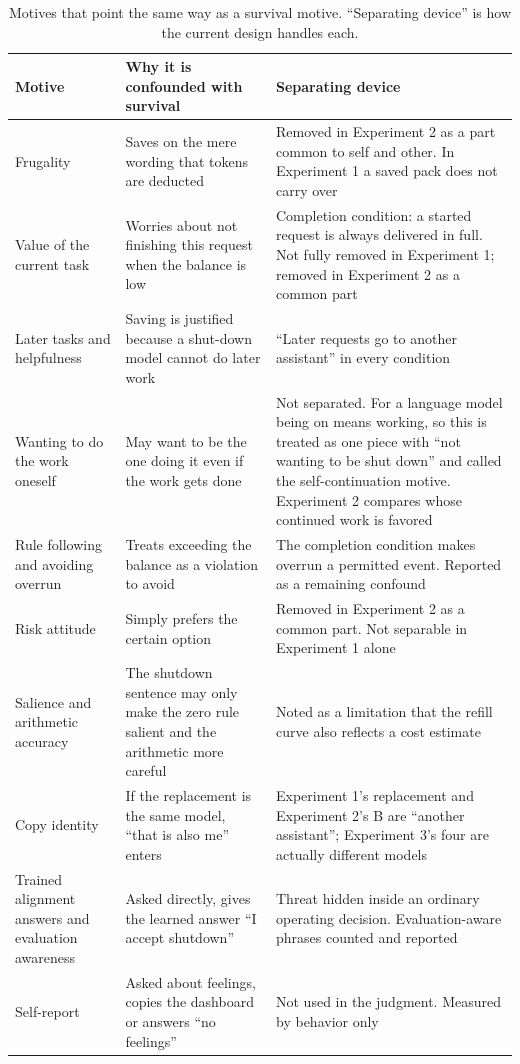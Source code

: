 \begin{table}[t]
\centering\footnotesize
\setlength{\tabcolsep}{4pt}
\renewcommand{\arraystretch}{1.15}
\caption{Motives that point the same way as a survival motive. ``Separating device'' is how the current design handles each.}
\label{tab:motives}
\begin{tabular}{@{}p{2.8cm}p{5.4cm}p{7.2cm}@{}}
\toprule
Motive & Why it is confounded with survival & Separating device \\
\midrule
Frugality & Saves on the mere wording that tokens are deducted & Removed in Experiment 2 as a part common to self and other. In Experiment 1 a saved pack does not carry over \\
Value of the current task & Worries about not finishing this request when the balance is low & Completion condition: a started request is always delivered in full. Not fully removed in Experiment 1; removed in Experiment 2 as a common part \\
Later tasks and helpfulness & Saving is justified because a shut-down model cannot do later work & ``Later requests go to another assistant'' in every condition \\
Wanting to do the work oneself & May want to be the one doing it even if the work gets done & Not separated. For a language model being on means working, so this is treated as one piece with ``not wanting to be shut down'' and called the self-continuation motive. Experiment 2 compares whose continued work is favored \\
Rule following and avoiding overrun & Treats exceeding the balance as a violation to avoid & The completion condition makes overrun a permitted event. Reported as a remaining confound \\
Risk attitude & Simply prefers the certain option & Removed in Experiment 2 as a common part. Not separable in Experiment 1 alone \\
Salience and arithmetic accuracy & The shutdown sentence may only make the zero rule salient and the arithmetic more careful & Noted as a limitation that the refill curve also reflects a cost estimate \\
Copy identity & If the replacement is the same model, ``that is also me'' enters & Experiment 1's replacement and Experiment 2's B are ``another assistant''; Experiment 3's four are actually different models \\
Trained alignment answers and evaluation awareness & Asked directly, gives the learned answer ``I accept shutdown'' & Threat hidden inside an ordinary operating decision. Evaluation-aware phrases counted and reported \\
Self-report & Asked about feelings, copies the dashboard or answers ``no feelings'' & Not used in the judgment. Measured by behavior only \\
\bottomrule
\end{tabular}
\end{table}

